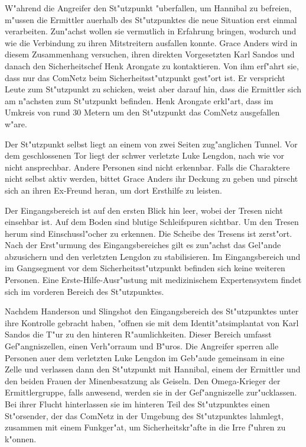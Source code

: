 W"ahrend die Angreifer den St"utzpunkt "uberfallen, um Hannibal zu befreien, m"ussen die Ermittler au\3erhalb des St"utzpunktes die neue Situation erst einmal verarbeiten. Zun"achst wollen sie vermutlich in Erfahrung bringen, wodurch und wie die Verbindung zu ihren Mitstreitern ausfallen konnte. Grace Anders wird in diesem Zusammenhang versuchen, ihren direkten Vorgesetzten Karl Sandos und danach den Sicherheitschef Henk Arongate zu kontaktieren. Von ihm erf"ahrt sie, dass nur das ComNetz beim Sicherheitsst"utzpunkt gest"ort ist. Er verspricht Leute zum St"utzpunkt zu schicken, weist aber darauf hin, dass die Ermittler sich am n"achsten zum St"utzpunkt befinden. Henk Arongate erkl"art, dass im Umkreis von rund 30 Metern um den St"utzpunkt das ComNetz ausgefallen w"are. 

Der St"utzpunkt selbst liegt an einem von zwei Seiten zug"anglichen Tunnel. Vor dem geschlossenen Tor liegt der schwer verletzte Luke Lengdon, nach wie vor nicht ansprechbar. Andere Personen sind nicht erkennbar. Falls die Charaktere nicht selbst aktiv werden, bittet Grace Anders ihr Deckung zu geben und pirscht sich an ihren Ex-Freund heran, um dort Ersthilfe zu leisten.

Der Eingangsbereich ist auf den ersten Blick hin leer, wobei der Tresen nicht einsehbar ist. Auf dem Boden sind blutige Schleifspuren  sichtbar. Um den Tresen herum sind Einschussl"ocher zu erkennen. Die Scheibe des Tresens ist zerst"ort. Nach der Erst"urmung des Eingangsbereiches gilt es zun"achst das Gel"ande abzusichern und den verletzten Lengdon zu stabilisieren. Im Eingangsbereich und im Gangsegment vor dem Sicherheitsst"utzpunkt befinden sich keine weiteren Personen. Eine Erste-Hilfe-Ausr"ustung mit medizinischem Expertensystem findet sich im vorderen Bereich des St"utzpunktes.

Nachdem Handerson und Slingshot den Eingangsbereich des St"utzpunktes unter ihre Kontrolle gebracht haben, "offnen sie mit dem Identit"atsimplantat von Karl Sandos die T"ur zu den hinteren R"aumlichkeiten. Dieser Bereich umfasst Gef"angniszellen, einen Verh"orraum und B"uros. Die Angreifer sperren alle Personen au\3er dem verletzten Luke Lengdon im Geb"aude gemeinsam in eine Zelle und verlassen dann den St"utzpunkt mit Hannibal, einem der Ermittler und den beiden Frauen der Minenbesatzung als Geiseln. Den Omega-Krieger der Ermittlergruppe, falls anwesend, werden sie in der Gef"angniszelle zur"ucklassen. Bei ihrer Flucht hinterlassen sie im hinteren Teil des St"utzpunktes einen St"orsender, der das ComNetz in der Umgebung des St"utzpunktes lahmlegt, zusammen mit einem Funkger"at, um Sicherheitskr"afte in die Irre f"uhren zu k"onnen.

